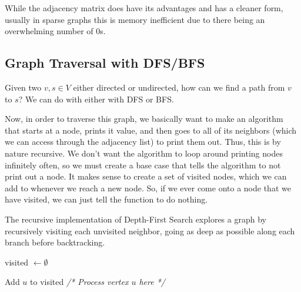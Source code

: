   While the adjacency matrix does have its advantages and has a cleaner form, usually in sparse graphs this is memory inefficient due to there being an overwhelming number of $0$s. 

  \begin{algo}
    
  \end{algo}

  \begin{algo}
    
  \end{algo}

  \begin{algo}
    
  \end{algo} 

\subsection{Graph Traversal with DFS/BFS}

  Given two $v, s \in V$ either directed or undirected, how can we find a path from $v$ to $s$? We can do with either with DFS or BFS. 

  Now, in order to traverse this graph, we basically want to make an algorithm that starts at a node, prints it value, and then goes to all of its neighbors (which we can access through the adjacency list) to print them out. Thus, this is by nature recursive. We don't want the algorithm to loop around printing nodes infinitely often, so we must create a base case that tells the algorithm to not print out a node. It makes sense to create a set of visited nodes, which we can add to whenever we reach a new node. So, if we ever come onto a node that we have visited, we can just tell the function to do nothing. 

  \begin{algo}
    The recursive implementation of Depth-First Search explores a graph by recursively visiting each unvisited neighbor, going as deep as possible along each branch before backtracking.
    \begin{algorithm}[H]
      \label{alg:dfs_recursive}
      \begin{algorithmic}[1]
        
          \State visited $\gets \emptyset$ 
          \State {}
        \EndFunction
        
          \State Add $u$ to visited
          \State \textit{/* Process vertex $u$ here */}
              \State {}
            \EndIf
          \EndFor
        \EndFunction
      \end{algorithmic}
    \end{algorithm}
  \end{algo}

